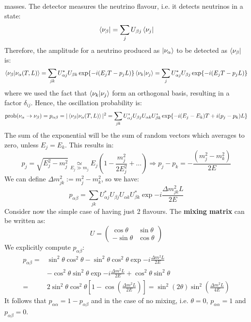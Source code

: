 \documentclass[10.75pt,a4paper,openright,bottom=2cm]{article}
\begin{document}
masses. The detector measures the neutrino flavour, i.e. it detects neutrinos in a state:
\[
\bra{\nu_\beta}=\sum_jU_{\beta j}\bra{\nu_j}
\]
Therefore, the amplitude for a neutrino produced as $\ket{\nu_\alpha}$ to be detected as $\bra{\nu_\beta}$ is:
\[
\braket{\nu_\beta}{\nu_\alpha(T,L)}=\sum_{jk}U_{\alpha j}^*U_{\beta k}\exp{-i(E_jT-p_jL)}\braket{\nu_k}{\nu_j}=\sum_jU_{\alpha j}^*U_{\beta j}\exp{-i(E_jT-p_jL)}
\]
where we used the fact that $\braket{\nu_k}{\nu_j}$ form an orthogonal basis, resulting in a factor $\delta_{ij}$. Hence, the oscillation probability is:
\[
\text{prob}(\nu_\alpha\to\nu_\beta)=p_{\alpha\beta}=|\braket{\nu_\beta}{\nu_\alpha(T,L)}|^2=\sum_{jk}U_{\alpha j}^*U_{\beta j}U_{\alpha k}U_{\beta k}^*\exp{-i(E_j-E_k)T+i(p_j-p_k)L}
\]
The sum of the exponential will be the sum of random vectors which averages to zero, unless $E_j=E_k$. This results in:
\[
p_j=\sqrt{E_j^2-m_j^2}\underset{E_j\gg m_j}{\simeq}E_j\left(1-\frac{m_j^2}{2E_j^2}+\dots\right)\Rightarrow p_j-p_k=-\frac{(m_j^2-m_k^2)}{2E}
\]
We can define $\Delta m_{jk}^2:=m_j^2-m_k^2$, so we have:
\[
p_{\alpha\beta}=\sum_{jk}U_{\alpha j}^*U_{\beta j}U_{\alpha k}U_{\beta k}^*\exp{-i\frac{\Delta m_{jk}^2L}{2E}}
\]
Consider now the simple case of having just 2 flavours. The \textbf{mixing matrix} can be written as:
\[
U=\left(\begin{array}{cc}
    \cos\theta & \sin\theta \\
    -\sin\theta & \cos\theta
\end{array}\right)
\]
We explicitly compute $p_{\alpha\beta}$:
\begin{align*}
p_{\alpha\beta}=&\sin^2\theta\cos^2\theta-\sin^2\theta\cos^2\theta\exp{-i\frac{\Delta m^2L}{2E}}\\
&-\cos^2\theta\sin^2\theta\exp{-i\frac{\Delta m^2L}{2E}}+\cos^2\theta\sin^2\theta\\
=&2\sin^2\theta\cos^2\theta\left[1-\cos\left(\frac{\Delta m^2L}{2E}\right)\right]=\sin^2(2\theta)\sin^2\left(\frac{\Delta m^2L}{4E}\right)
\end{align*}
It follows that $p_{\alpha\alpha}=1-p_{\alpha\beta}$ and in the case of no mixing, i.e. $\theta=0$, $p_{\alpha\alpha}=1$ and $p_{\alpha\beta}=0$.
\end{document}
